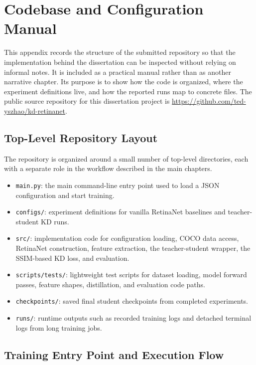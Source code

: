 \chapter{Codebase and Configuration Manual}

This appendix records the structure of the submitted repository so that the implementation behind the dissertation can be inspected without relying on informal notes. It is included as a practical manual rather than as another narrative chapter. Its purpose is to show how the code is organized, where the experiment definitions live, and how the reported runs map to concrete files. The public source repository for this dissertation project is \url{https://github.com/ted-yszhao/kd-retinanet}.

\section{Top-Level Repository Layout}

The repository is organized around a small number of top-level directories, each with a separate role in the workflow described in the main chapters.

\begin{itemize}
    \item \texttt{main.py}: the main command-line entry point used to load a JSON configuration and start training.
    \item \texttt{configs/}: experiment definitions for vanilla RetinaNet baselines and teacher-student KD runs.
    \item \texttt{src/}: implementation code for configuration loading, COCO data access, RetinaNet construction, feature extraction, the teacher-student wrapper, the SSIM-based KD loss, and evaluation.
    \item \texttt{scripts/tests/}: lightweight test scripts for dataset loading, model forward passes, feature shapes, distillation, and evaluation code paths.
    \item \texttt{checkpoints/}: saved final student checkpoints from completed experiments.
    \item \texttt{runs/}: runtime outputs such as recorded training logs and detached terminal logs from long training jobs.
\end{itemize}

\section{Training Entry Point and Execution Flow}

